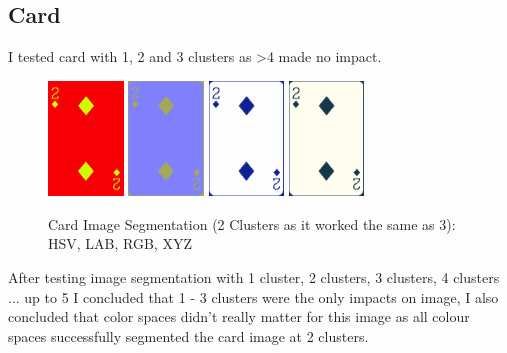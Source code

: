 \documentclass[conference]{IEEEtran}
\begin{document}
\subsection{Card}
I tested card with 1, 2 and 3 clusters as >4 made no impact.
\begin{figure}[htbp]
    \centerline{
        {\includegraphics[width=20mm, scale=0.5]{./figures/task 4/card/2 clusters HSV.png}}
        {\includegraphics[width=20mm, scale=0.5]{./figures/task 4/card/2 clusters LAB.png}}
        {\includegraphics[width=20mm, scale=0.5]{./figures/task 4/card/2 clusters RGB.png}}
        {\includegraphics[width=20mm, scale=0.5]{./figures/task 4/card/2 clusters XYZ.png}}
    }
    \caption{Card Image Segmentation (2 Clusters as it worked the same as 3): HSV, LAB, RGB, XYZ}
    \label{fig}
\end{figure}
After testing image segmentation with 1 cluster, 2 clusters, 3 clusters, 4 clusters ... up to 5 I concluded that 1 - 3 clusters were
the only impacts on image, I also concluded that color spaces didn't really matter for this image as all colour spaces successfully
segmented the card image at 2 clusters.
\end{document}
